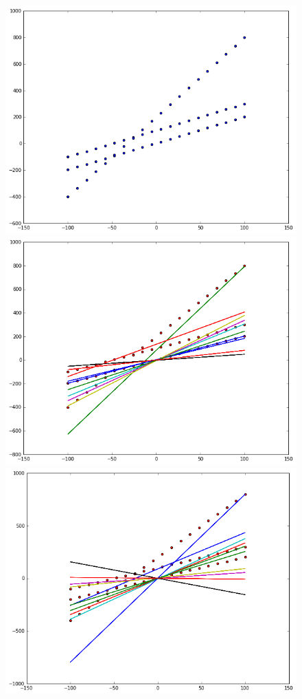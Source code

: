 \begin{figure}[H]
   \centering
   \includegraphics[scale=0.15]{figures/cross_ground_truth.png} 
   \includegraphics[scale=0.15]{figures/first_iter_cross.png}
   \includegraphics[scale=0.15]{figures/second_iter_cross.png}

\end{figure}
